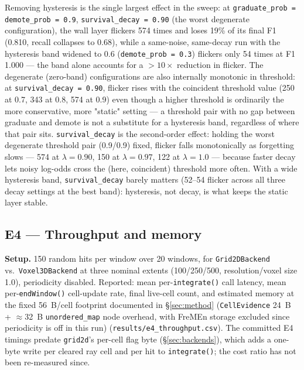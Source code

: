 \documentclass[conference]{IEEEtran}
\begin{document}
Removing hysteresis is the single largest effect in the sweep: at
\texttt{graduate\_prob = demote\_prob = 0.9}, \texttt{survival\_decay = 0.90} (the worst
degenerate configuration), the wall layer flickers 574 times and loses
19\% of its final F1 (0.810, recall collapses to 0.68), while a
same-noise, same-decay run with the hysteresis band widened to 0.6
(\texttt{demote\_prob = 0.3}) flickers only 54 times at F1 1.000 --- the band alone
accounts for a $>10\times$ reduction in flicker. The degenerate
(zero-band) configurations are also internally monotonic in threshold: at
\texttt{survival\_decay = 0.90}, flicker rises with the coincident threshold value
(250 at 0.7, 343 at 0.8, 574 at 0.9) even though a higher threshold is
ordinarily the more conservative, more "static" setting --- a threshold pair
with no gap between graduate and demote is not a substitute for a
hysteresis band, regardless of where that pair sits.
\texttt{survival\_decay} is the second-order effect: holding the worst degenerate
threshold pair (0.9/0.9) fixed, flicker falls monotonically as forgetting
slows --- 574 at $\lambda{=}0.90$, 150 at $\lambda{=}0.97$, 122 at
$\lambda{=}1.0$ --- because faster decay lets noisy log-odds cross the
(here, coincident) threshold more often. With a wide hysteresis band,
\texttt{survival\_decay} barely matters (52--54 flicker across all three decay
settings at the best band): hysteresis, not decay, is what keeps the
static layer stable.

\subsection{E4 --- Throughput and memory}

\textbf{Setup.} 150 random hits per window over 20 windows, for \texttt{Grid2DBackend}
vs.\ \texttt{Voxel3DBackend} at three nominal extents (100/250/500, resolution/voxel
size 1.0), periodicity disabled. Reported: mean per-\texttt{integrate()} call
latency, mean per-\texttt{endWindow()} cell-update rate, final live-cell count, and
estimated memory at the fixed 56~B/cell footprint documented in \S\ref{sec:method}
(\texttt{CellEvidence} 24~B + $\approx$32~B \texttt{unordered\_map} node overhead, with
FreMEn storage excluded since periodicity is off in this run)
(\texttt{results/e4\_throughput.csv}). The committed E4 timings predate \texttt{grid2d}'s
per-cell flag byte (\S\ref{sec:backends}), which adds a one-byte write per
cleared ray cell and per hit to \texttt{integrate()}; the cost ratio has not
been re-measured since.
\end{document}

